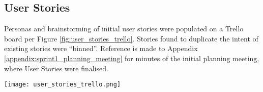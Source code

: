 \subsection{User Stories}


Personas and brainstorming of initial user stories were populated on a Trello board per Figure \ref{fig:user_stories_trello}.
Stories found to duplicate the intent of existing stories were ``binned''. 
Reference is made to Appendix \ref{appendix:sprint1_planning_meeting} for minutes of the initial planning meeting, where User Stories were finalised.

\begin{center}
	\texttt{[image: user\_stories\_trello.png]}
	\label{fig:user_stories_trello}
\end{center}
